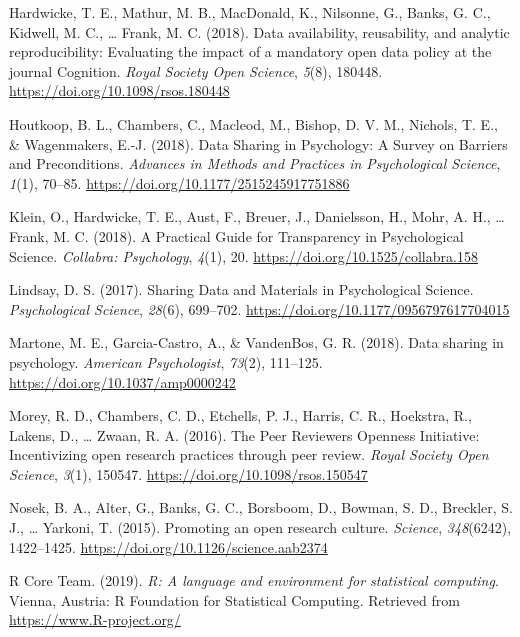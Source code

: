 \documentclass[
  english,
  jou,floatsintext]{apa6}
\newlength{\cslhangindent}
\newenvironment{cslreferences}%
  {\setlength{\parindent}{0pt}%
  \everypar{\setlength{\hangindent}{\cslhangindent}}\ignorespaces}%
  {\par}
\begin{document}
\begin{cslreferences}
\leavevmode\hypertarget{ref-HardwickeDataavailabilityreusability2018}{}%
Hardwicke, T. E., Mathur, M. B., MacDonald, K., Nilsonne, G., Banks, G. C., Kidwell, M. C., \ldots{} Frank, M. C. (2018). Data availability, reusability, and analytic reproducibility: Evaluating the impact of a mandatory open data policy at the journal Cognition. \emph{Royal Society Open Science}, \emph{5}(8), 180448. \url{https://doi.org/10.1098/rsos.180448}

\leavevmode\hypertarget{ref-HoutkoopDataSharingPsychology2018}{}%
Houtkoop, B. L., Chambers, C., Macleod, M., Bishop, D. V. M., Nichols, T. E., \& Wagenmakers, E.-J. (2018). Data Sharing in Psychology: A Survey on Barriers and Preconditions. \emph{Advances in Methods and Practices in Psychological Science}, \emph{1}(1), 70--85. \url{https://doi.org/10.1177/2515245917751886}

\leavevmode\hypertarget{ref-KleinPracticalGuideTransparency2018}{}%
Klein, O., Hardwicke, T. E., Aust, F., Breuer, J., Danielsson, H., Mohr, A. H., \ldots{} Frank, M. C. (2018). A Practical Guide for Transparency in Psychological Science. \emph{Collabra: Psychology}, \emph{4}(1), 20. \url{https://doi.org/10.1525/collabra.158}

\leavevmode\hypertarget{ref-LindsaySharingDataMaterials2017}{}%
Lindsay, D. S. (2017). Sharing Data and Materials in Psychological Science. \emph{Psychological Science}, \emph{28}(6), 699--702. \url{https://doi.org/10.1177/0956797617704015}

\leavevmode\hypertarget{ref-MartoneDatasharingpsychology2018}{}%
Martone, M. E., Garcia-Castro, A., \& VandenBos, G. R. (2018). Data sharing in psychology. \emph{American Psychologist}, \emph{73}(2), 111--125. \url{https://doi.org/10.1037/amp0000242}

\leavevmode\hypertarget{ref-morey_peer_2016}{}%
Morey, R. D., Chambers, C. D., Etchells, P. J., Harris, C. R., Hoekstra, R., Lakens, D., \ldots{} Zwaan, R. A. (2016). The Peer Reviewers Openness Initiative: Incentivizing open research practices through peer review. \emph{Royal Society Open Science}, \emph{3}(1), 150547. \url{https://doi.org/10.1098/rsos.150547}

\leavevmode\hypertarget{ref-nosek_promoting_2015}{}%
Nosek, B. A., Alter, G., Banks, G. C., Borsboom, D., Bowman, S. D., Breckler, S. J., \ldots{} Yarkoni, T. (2015). Promoting an open research culture. \emph{Science}, \emph{348}(6242), 1422--1425. \url{https://doi.org/10.1126/science.aab2374}

\leavevmode\hypertarget{ref-R-base}{}%
R Core Team. (2019). \emph{R: A language and environment for statistical computing}. Vienna, Austria: R Foundation for Statistical Computing. Retrieved from \url{https://www.R-project.org/}


\end{cslreferences}
\end{document}
